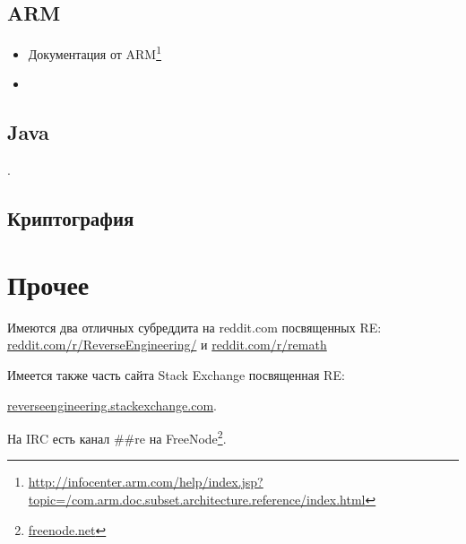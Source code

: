 \section{ARM}

\begin{itemize}
\item Документация от ARM\footnote{\AlsoAvailableAs \url{http://infocenter.arm.com/help/index.jsp?topic=/com.arm.doc.subset.architecture.reference/index.html}}

\item \ARMSixFourRefURL
\end{itemize}

\section{Java}

\Javabook.

\section{Криптография}



\chapter{Прочее}

Имеются два отличных субреддита на reddit.com посвященных \ac{RE}:
\href{http://go.yurichev.com/17027}{reddit.com/r/ReverseEngineering/} и
\href{http://go.yurichev.com/17028}{reddit.com/r/remath}

Имеется также часть сайта Stack Exchange посвященная \ac{RE}:

\par \href{http://go.yurichev.com/17029}{reverseengineering.stackexchange.com}.

На IRC есть канал \#\#re на
FreeNode\footnote{\href{http://go.yurichev.com/17030}{freenode.net}}.

